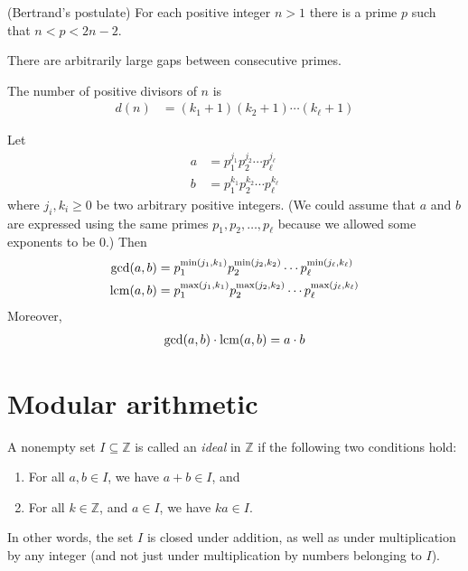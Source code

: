 \documentclass[a4paper, 12pt]{book} %
\begin{document}
\begin{theorem}
    (Bertrand's postulate) For each positive integer $n > 1$ there is a
prime $p$ such that $n < p < 2n - 2$.
\end{theorem}

\begin{theorem}
    There are arbitrarily large gaps between consecutive primes.
\end{theorem}


\begin{proposition}
    The number of positive divisors of $n$ is
    \begin{align}
        d(n) &= (k_1 + 1)(k_2 + 1) \cdots (k_\ell +1)
    \end{align}
\end{proposition}


\begin{proposition}
    Let
    \begin{align}
        a &= p_1^{j_1} p_2^{j_2} \cdots p_{\ell}^{j_\ell} \\
        b &= p_1^{k_1} p_2^{k_2} \cdots p_{\ell}^{k_\ell} 
    \end{align}
    where $j_i, k_i \geq 0$ be two arbitrary positive integers. (We could assume that $a$ and $b$ are expressed using the same primes $p_1, p_2, \ldots , p_\ell$ because we allowed some exponents to be 0.) Then
    \begin{align}
        \gcd(a, b) &= p_1^{\min(j_1, k_1)} p_2^{\min(j_2, k_2)} \cdots p_\ell^{\min(j_\ell, k_\ell)} \\
        \mathrm{lcm}(a, b) &= p_1^{\max(j_1, k_1)} p_2^{\max(j_2, k_2)} \cdots p_\ell^{\max(j_\ell, k_\ell)} \\
    \end{align}
    Moreover,
    \begin{align}
        \gcd(a, b) \cdot \mathrm{lcm}(a, b) = a \cdot b
    \end{align}
\end{proposition}


\section{Modular arithmetic}

A nonempty set $I \subseteq \mathbb{Z}$ is called an \emph{ideal} in $\mathbb{Z}$ if the following two conditions hold:
\begin{enumerate}
    \item For all $a, b \in I$, we have $a + b \in I$, and
    \item For all $k \in \mathbb{Z}$, and $a \in I$, we have $ka \in I$.
\end{enumerate}
In other words, the set $I$ is closed under addition, as well as under multiplication by any integer (and not just under multiplication by numbers belonging to $I$).
\end{document}
